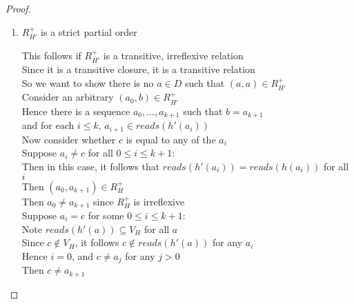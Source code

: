 \begin{proof}
\begin{enumerate}
\item $R^+_{H'}$ is a strict partial order 
  \begin{tabbedproof}
    \oo This follows if $R^+_{H'}$ is a transitive, irreflexive relation \\
    \oo Since it is a transitive closure, it is a transitive relation \\
    \oo So we want to show there is no $a \in D$ such that $(a,a) \in R^+_{H'}$ \\
    \oo Consider an arbitrary $(a_0, b) \in R^+_{H'}$ \\
    \oo Hence there is a sequence $a_0, \ldots, a_{k+1}$ such that $b = a_{k+1}$ \\
    \ox and for each $i \leq k$, $a_{i+1} \in \mathit{reads}(h'(a_i))$ \\
    \oo Now consider whether $c$ is equal to any of the $a_i$ \\
    \oo Suppose $a_i \not= c$ for all $0 \leq i \leq k+1$: \\
    \ooo Then in this case, it follows that $\mathit{reads}(h'(a_i)) = \mathit{reads}(h(a_i))$ for all $i$\\
    \ooo Then $(a_0, a_{k+1}) \in R^+_H$ \\
    \ooo Then $a_0 \not= a_{k+1}$ since $R^+_H$ is irreflexive \\
    \oo Suppose $a_i = c$ for some $0 \leq i \leq k+1$: \\
    \ooo Note $\mathit{reads}(h'(a)) \subseteq V_H$ for all $a$  \\
    \ooo Since $c \not\in V_H$, it follows $c \not\in \mathit{reads}(h'(a))$ for any $a_i$ \\
    \ooo Hence $i = 0$, and $c \not= a_j$ for any $j > 0$ \\
    \ooo Then $c \not= a_{k+1}$
  \end{tabbedproof}


\end{enumerate}
\end{proof}
